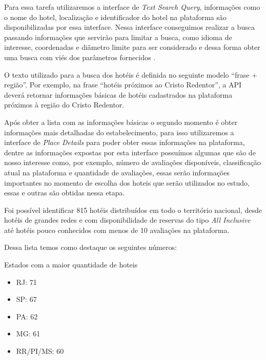 Para essa tarefa utilizaremos a interface de \emph{Text Search Query}, informações como o nome do hotel, localização e identificador do hotel na plataforma são disponibilizadas por essa interface. Nessa interface conseguimos realizar a busca passando informações que servirão para limitar a busca, como idioma de interesse, coordenadas e diâmetro limite para ser considerado e dessa forma obter uma busca com viés dos parâmetros fornecidos \cite{placesSearchText2023}.



O texto utilizado para a busca dos hotéis é definida no seguinte modelo “frase + região”. Por exemplo, na frase “hotéis próximos ao Cristo Redentor”, a API deverá retornar informações básicas de hotéis cadastrados na plataforma próximos à região do Cristo Redentor.

Após obter a lista com as informações básicas o segundo momento é obter informações mais detalhadas do estabelecimento, para isso utilizaremos a interface de \emph{Place Details} para poder obter essas informações na plataforma, dentre as informações expostas por esta interface possuímos algumas que são de nosso interesse como, por exemplo, número de avaliações disponíveis, classificação atual na plataforma e quantidade de avaliações, essas serão informações importantes no momento de escolha dos hoteis que serão utilizados no estudo, essas e outras são obtidas nessa etapa.



Foi possível identificar 815 hotéis distribuídos em todo o território nacional, desde hotéis de grandes redes e com disponibilidade de reservas do tipo \emph{All Inclusive} até hotéis pouco conhecidos com menos de 10 avaliações na plataforma.

Dessa lista temos como destaque os seguintes números:

Estados com a maior quantidade de hoteis
\begin{itemize}
   \item RJ: 71
   \item SP: 67
   \item PA: 62
   \item MG: 61
   \item RR/PI/MS: 60
\end{itemize}

